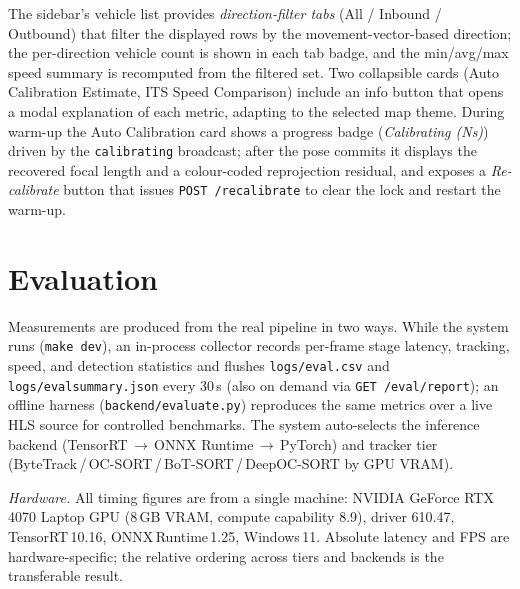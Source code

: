 \documentclass[conference]{IEEEtran}
\renewcommand{\_}{\textunderscore\allowbreak}
\begin{document}
The sidebar's vehicle list provides \emph{direction-filter tabs} (All / Inbound /
Outbound) that filter the displayed rows by the movement-vector-based direction; the
per-direction vehicle count is shown in each tab badge, and the min/avg/max speed
summary is recomputed from the filtered set. Two collapsible cards (Auto Calibration
Estimate, ITS Speed Comparison) include an info button that opens a modal explanation
of each metric, adapting to the selected map theme. During warm-up the Auto Calibration
card shows a progress badge (\emph{Calibrating (Ns)}) driven by the \texttt{calibrating}
broadcast; after the pose commits it displays the recovered focal length and a
colour-coded reprojection residual, and exposes a \emph{Re-calibrate} button that issues
\texttt{POST /recalibrate} to clear the lock and restart the warm-up.

\section{Evaluation}\label{sec:eval}
Measurements are produced from the real pipeline in two ways. While the system runs
(\texttt{make dev}), an in-process collector records per-frame stage latency,
tracking, speed, and detection statistics and flushes \texttt{logs/eval\_*.csv} and
\texttt{logs/eval\_summary.json} every 30\,s (also on demand via \texttt{GET /eval/report});
an offline harness (\texttt{backend/evaluate.py}) reproduces the same metrics over a
live HLS source for controlled benchmarks. The system auto-selects the inference backend
(TensorRT\,$\to$\,ONNX Runtime\,$\to$\,PyTorch) and tracker tier (ByteTrack\,/\,OC-SORT\,/\,BoT-SORT\,/\,DeepOC-SORT by GPU VRAM).

\textit{Hardware.} All timing figures are from a single machine: NVIDIA GeForce
RTX\,4070 Laptop GPU (8\,GB VRAM, compute capability 8.9), driver 610.47,
TensorRT\,10.16, ONNX\,Runtime\,1.25, Windows\,11. Absolute latency and FPS are
hardware-specific; the relative ordering across tiers and backends is the
transferable result.
\end{document}
